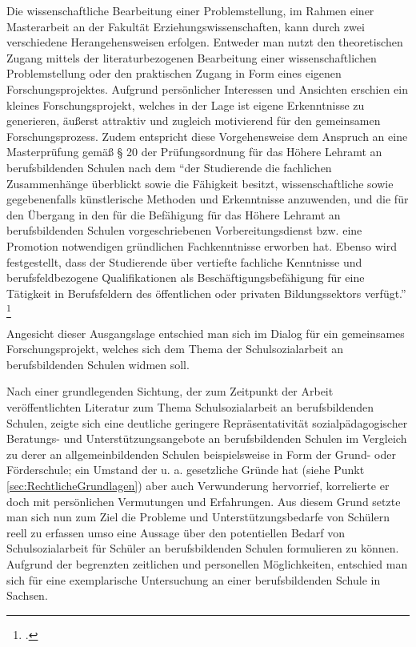 Die wissenschaftliche Bearbeitung einer Problemstellung, im Rahmen einer Masterarbeit an der Fakultät Erziehungswissenschaften, kann durch zwei verschiedene Herangehensweisen erfolgen. Entweder man nutzt den theoretischen Zugang mittels der literaturbezogenen Bearbeitung einer wissenschaftlichen Problemstellung oder den praktischen Zugang in Form eines eigenen Forschungsprojektes.
Aufgrund persönlicher Interessen und Ansichten erschien ein kleines Forschungsprojekt, welches in der Lage ist eigene Erkenntnisse zu generieren, äußerst attraktiv und zugleich motivierend für den gemeinsamen Forschungsprozess. Zudem entspricht diese Vorgehensweise dem Anspruch an eine Masterprüfung gemäß § 20 der Prüfungsordnung für das Höhere Lehramt an berufsbildenden Schulen nach dem "`der Studierende die fachlichen Zusammenhänge überblickt sowie die Fähigkeit besitzt, wissenschaftliche sowie gegebenenfalls künstlerische Methoden und Erkenntnisse anzuwenden, und die für den Übergang in den für die Befähigung für das Höhere Lehramt an berufsbildenden Schulen vorgeschriebenen Vorbereitungsdienst bzw. eine Promotion notwendigen gründlichen Fachkenntnisse erworben hat. Ebenso wird festgestellt, dass der Studierende über vertiefte fachliche Kenntnisse und berufsfeldbezogene Qualifikationen als Beschäftigungsbefähigung für eine Tätigkeit in Berufsfeldern des öffentlichen oder privaten Bildungssektors verfügt."' \footcite[13]{TUDresden2010}

Angesicht dieser Ausgangslage entschied man sich im Dialog für ein gemeinsames Forschungsprojekt, welches sich dem Thema der Schulsozialarbeit an berufsbildenden Schulen widmen soll. 

Nach einer grundlegenden Sichtung, der zum Zeitpunkt der Arbeit veröffentlichten Literatur zum Thema Schulsozialarbeit an berufsbildenden Schulen, zeigte sich eine deutliche geringere Repräsentativität sozialpädagogischer Beratungs- und Unterstützungsangebote an berufsbildenden Schulen im Vergleich zu derer an allgemeinbildenden Schulen beispielsweise in Form der Grund- oder Förderschule; ein Umstand der u. a. gesetzliche Gründe hat (siehe Punkt \ref{sec:RechtlicheGrundlagen}) aber auch Verwunderung hervorrief, korrelierte er doch mit persönlichen Vermutungen und Erfahrungen. Aus diesem Grund setzte man sich nun zum Ziel die Probleme und Unterstützungsbedarfe von Schülern reell zu erfassen umso eine Aussage über den potentiellen Bedarf von Schulsozialarbeit für Schüler an berufsbildenden Schulen formulieren zu können. Aufgrund der begrenzten zeitlichen und personellen Möglichkeiten, entschied man sich für eine exemplarische Untersuchung an einer berufsbildenden Schule in Sachsen.
 
